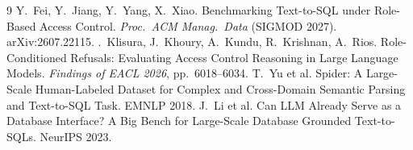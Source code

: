 \documentclass[11pt]{article}
\begin{document}
\begin{thebibliography}{9}
 Y.~Fei, Y.~Jiang, Y.~Yang, X.~Xiao. Benchmarking Text-to-SQL under Role-Based
Access Control. \emph{Proc.\ ACM Manag.\ Data} (SIGMOD 2027). arXiv:2607.22115.
 \DJ.~Klisura, J.~Khoury, A.~Kundu, R.~Krishnan, A.~Rios. Role-Conditioned
Refusals: Evaluating Access Control Reasoning in Large Language Models. \emph{Findings of EACL 2026},
pp.~6018--6034.
 T.~Yu et al. Spider: A Large-Scale Human-Labeled Dataset for Complex and Cross-Domain
Semantic Parsing and Text-to-SQL Task. EMNLP 2018.
 J.~Li et al. Can LLM Already Serve as a Database Interface? A Big Bench for Large-Scale
Database Grounded Text-to-SQLs. NeurIPS 2023.
\end{thebibliography}
\end{document}
